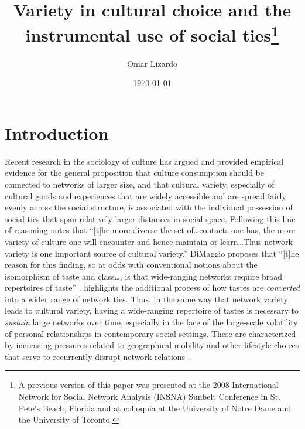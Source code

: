 \documentclass[12pt]{article}
\begin{document}
\title{Variety in cultural choice and the instrumental use of social ties\thanks{A previous version of this paper was presented at the 2008 International Network for Social Network Analysis (INSNA) Sunbelt Conference in St. Pete's Beach, Florida and at colloquia at the University of Notre Dame and the University of Toronto. }}
\author[1]{Omar Lizardo}


\date{\normalsize \today}

\maketitle




\doublespacing
\newpage 
\section{Introduction}
Recent research in the sociology of culture has argued and provided empirical evidence for the general proposition that culture consumption should be connected to networks of larger size, and that cultural variety, especially of cultural goods and experiences that are widely accessible and are spread fairly evenly across the social structure, is associated with the individual possession of social ties that span relatively larger distances in social space. Following this line of reasoning \citet[247]{erickson96} notes that ``[t]he more diverse the set of{\ldots}contacts one has, the more variety of culture one will encounter and hence maintain or learn{\ldots}Thus network variety is one important source of cultural variety.'' DiMaggio proposes that ``[t]he reason for this finding, so at odds with conventional notions about the isomorphism of taste and class{\ldots}, is that wide-ranging networks require broad repertoires of taste'' \citeyearpar[444]{dimaggio87}. \citet{lizardo06a} highlights the additional process of how tastes are \emph{converted} into a wider range of network ties. Thus, in the same way that network variety leads to cultural variety, having a wide-ranging repertoire of tastes is necessary to \emph{sustain} large networks over time, especially in the face of the large-scale volatility of personal relationships in contemporary social settings.  These are characterized by increasing pressures related to geographical mobility and other lifestyle choices that serve to recurrently disrupt network relations \citep{dimaggio96, dimaggio_mohr85, griswold_wright04, wellman_wortley90}.
\end{document}
